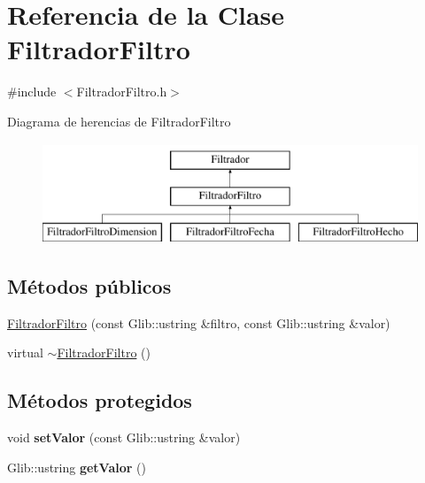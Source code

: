 \hypertarget{classFiltradorFiltro}{\section{\-Referencia de la \-Clase \-Filtrador\-Filtro}
\label{classFiltradorFiltro}
}


{\ttfamily \#include $<$\-Filtrador\-Filtro.\-h$>$}

\-Diagrama de herencias de \-Filtrador\-Filtro\begin{figure}[H]
\begin{center}
\leavevmode
\includegraphics[height=3.000000cm]{classFiltradorFiltro}
\end{center}
\end{figure}
\subsection*{\-Métodos públicos}
\begin{DoxyCompactItemize}
\item 
\hyperlink{classFiltradorFiltro_ae351a76bc1f25cd13690849099acd5b8}{\-Filtrador\-Filtro} (const \-Glib\-::ustring \&filtro, const \-Glib\-::ustring \&valor)
\item 
virtual \hyperlink{classFiltradorFiltro_a2711e32e97e506736fbf292e295008c0}{$\sim$\-Filtrador\-Filtro} ()
\end{DoxyCompactItemize}
\subsection*{\-Métodos protegidos}
\begin{DoxyCompactItemize}
\item 
\hypertarget{classFiltradorFiltro_a19c28369cdcaa75763ace7d5d8437f35}{void {\bfseries set\-Valor} (const \-Glib\-::ustring \&valor)}\label{classFiltradorFiltro_a19c28369cdcaa75763ace7d5d8437f35}

\item 
\hypertarget{classFiltradorFiltro_a05e66a888382870d8e5a478c9ff64160}{\-Glib\-::ustring {\bfseries get\-Valor} ()}\label{classFiltradorFiltro_a05e66a888382870d8e5a478c9ff64160}

\end{DoxyCompactItemize}


